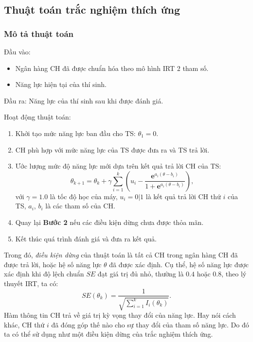 \subsection{Thuật toán trắc nghiệm thích ứng}
\subsubsection{Mô tả thuật toán}

\noindent Đầu vào:\par
\begin{itemize}
	\item Ngân hàng CH đã được chuẩn hóa theo mô hình IRT 2 tham số.
	\item Năng lực hiện tại của thí sinh.
\end{itemize}\par
\noindent Đầu ra: Năng lực của thí sinh sau khi được đánh giá.\par
\noindent Hoạt động thuật toán:\par
\begin{enumerate}[label=\textbf{Bước \arabic*.},align=left,left=0cm..0cm,itemindent=*]
	\item Khởi tạo mức năng lực ban đầu cho TS: $\theta_1=0$.
	\item CH phù hợp với mức năng lực của TS được đưa ra và TS trả lời.
	\item Ước lượng mức độ năng lực mới dựa trên kết quả trả lời CH của TS:
	\begin{equation}\label{eqn:eqn-s2-new-theta}
		\theta_{k+1}=\theta_k+\gamma\sum_{i=1}^{k}\left(u_i-\frac{\mathbf{e}^{a_i(\theta-b_i)}}{1+\mathbf{e}^{a_i(\theta-b_i)}}\right),
	\end{equation}
	với $\gamma=1.0$ là tốc độ học của máy, $u_i=0|1$ là kết quả trả lời CH thứ $i$ của TS, $a_i$, $b_i$ là các tham số của CH.
	\item Quay lại \textbf{Bước 2} nếu các điều kiện dừng chưa được thỏa mãn.
	\item Kết thúc quá trình đánh giá và đưa ra kết quả.
\end{enumerate}\par
Trong đó, \textit{điều kiện dừng} của thuật toán là tất cả CH trong ngân hàng CH đã được trả lời, hoặc hệ số năng lực $\theta$ đã được xác định. Cụ thể, hệ số năng lực được xác định khi độ lệch chuẩn $SE$ đạt giá trị đủ nhỏ, thường là $0.4$ hoặc $0.8$, theo lý thuyết IRT, ta có:
\begin{equation}\label{eqn:eqn-s2-se-theta}
	SE(\theta_k)=\frac{1}{\sqrt{\sum_{i=1}^{k}I_i(\theta_k)}}.
\end{equation}
Hàm thông tin CH trả về giá trị kỳ vọng thay đổi của năng lực. Hay nói cách khác, CH thứ $i$ đã đóng góp thế nào cho sự thay đổi của tham số năng lực. Do đó ta có thể sử dụng như một điều kiện dừng của trắc nghiệm thích ứng.\par

